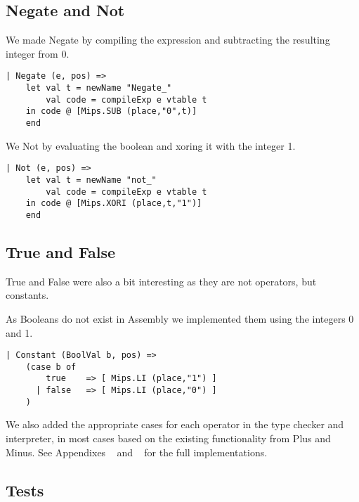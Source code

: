 \documentclass{article}
\begin{document}
\subsection{Negate and Not}
We made Negate by compiling the expression and subtracting the resulting integer from 0.
\begin{lstlisting}
| Negate (e, pos) =>
    let val t = newName "Negate_"
        val code = compileExp e vtable t
    in code @ [Mips.SUB (place,"0",t)]
    end
\end{lstlisting}
We Not by evaluating the boolean and xoring it with the integer 1.
\begin{lstlisting}
| Not (e, pos) =>
    let val t = newName "not_"
        val code = compileExp e vtable t
    in code @ [Mips.XORI (place,t,"1")]
    end
\end{lstlisting}

\subsection{True and False}
True and False were also a bit interesting as they are not operators, but constants.

\noindent As Booleans do not exist in Assembly we implemented them using the integers 0 and 1.
\begin{lstlisting}
| Constant (BoolVal b, pos) => 
    (case b of
        true    => [ Mips.LI (place,"1") ]
      | false   => [ Mips.LI (place,"0") ]
    )
\end{lstlisting}

We also added the appropriate cases for each operator in the type checker and interpreter, in most cases based on the existing functionality from Plus and Minus.
See Appendixes ~ and ~ for the full implementations.

\subsection{Tests}
\end{document}
